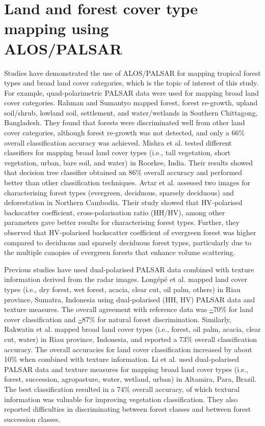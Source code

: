 \section{Land and forest cover type mapping using\\ ALOS/PALSAR}
\label{sec: litrev-forest-mapping-palsar}

Studies have demonstrated the use of ALOS/PALSAR for mapping tropical forest types and broad land cover categories, which is the topic of interest of this study. For example, quad-polarimetric PALSAR data were used for mapping broad land cover categories. Rahman and Sumantyo \citeyearpar{rahman_mapping_2010} mapped forest, forest re-growth, upland soil/shrub, lowland soil, settlement, and water/wetlands in Southern Chittagong, Bangladesh. They found that forests were discriminated well from other land cover categories, although forest re-growth was not detected, and only a 66\% overall classification accuracy was achieved. Mishra et al. \citeyearpar{mishra_land_2011} tested different classifiers for mapping broad land cover types (i.e., tall vegetation, short vegetation, urban, bare soil, and water) in Roorkee, India. Their results showed that decision tree classifier obtained an 86\% overall accuracy and performed better than other classification techniques. Avtar et al. \citeyearpar{avtar_characterization_2012} assessed two images for characterising forest types (evergreen, deciduous, sparsely deciduous) and deforestation in Northern Cambodia. Their study showed that HV-polarised backscatter coefficient, cross-polarisation ratio (HH/HV), among other parameters gave better results for characterising forest types. Further, they observed that HV-polarised backscatter coefficient of evergreen forest was higher compared to deciduous and sparsely deciduous forest types, particularly due to the multiple canopies of evergreen forests that enhance volume scattering.

Previous studies have used dual-polarised PALSAR data combined with texture information derived from the radar images. Longépé et al. \citeyearpar{longepe_assessment_2011} mapped land cover types (i.e., dry forest, wet forest, acacia, clear cut, oil palm, others) in Riau province, Sumatra, Indonesia using dual-polarised (HH, HV) PALSAR data and texture measures. The overall agreement with reference data was \url{~}70\% for land cover classification and \url{~}87\% for natural forest discrimination. Similarly, Rakwatin et al. \citeyearpar{rakwatin_using_2012} mapped broad land cover types (i.e., forest, oil palm, acacia, clear cut, water) in Riau province, Indonesia, and reported a 73\% overall classification accuracy. The overall accuracies for land cover classification increased by about 10\% when combined with texture information. Li et al. \citeyearpar{li_comparative_2012} used dual-polarised PALSAR data and texture measures for mapping broad land cover types (i.e., forest, succession, agropasture, water, wetland, urban) in Altamira, Para, Brazil. The best classification resulted in a 74\% overall accuracy, of which textural information was valuable for improving vegetation classification. They also reported difficulties in discriminating between forest classes and between forest succession classes.


